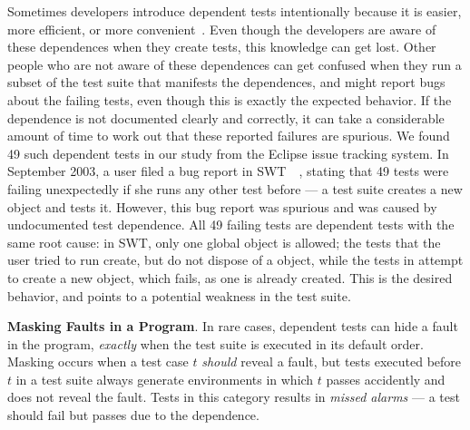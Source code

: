 Sometimes developers introduce dependent tests intentionally because it is
easier, more efficient, or more convenient~\cite{kapfhammeretal:FSE:2003, whittakeretal:2012}.
Even though the developers are aware of these dependences
when they create tests, this knowledge can get lost.
Other people who are not aware of these dependences can get confused 
when they run a subset of the test suite that manifests the
dependences, and might report bugs about the failing tests,
even though this is exactly the expected behavior. 
If the dependence is not documented clearly and
correctly, it can take a considerable amount of time to work out that
these reported failures are spurious. We found
49 such dependent tests in our study from the Eclipse issue tracking system.
In September 2003, a user filed a
bug report in SWT~\cite{swt}~\cite{eclipsebug},
stating that 49 tests were failing unexpectedly
if she runs any other test before  --- 
a test suite creates a new  object and tests it.
However, this bug report was spurious and was
caused by undocumented test dependence.
All 49 failing tests are dependent tests with the same
root cause: in SWT, only one global 
object is allowed; the tests that the user tried to run
create, but do not dispose of a  object, while
the tests in  attempt to create
a new  object, which fails, as one
is already created. This is the desired behavior,
and points to a potential weakness in the test suite.

\vspace{1mm}

\noindent \textbf{Masking Faults in a Program}. In rare cases,
dependent tests can hide a fault in the
program, \emph{exactly} when the test suite is executed in its default
order. Masking occurs when a test case $t$ \emph{should}
reveal a fault, but tests executed before $t$ in a test suite always
generate environments in which $t$ passes accidently and
does not reveal the fault. 
Tests in this category results in \textit{missed alarms} ---
a test should fail but passes due to the dependence.



